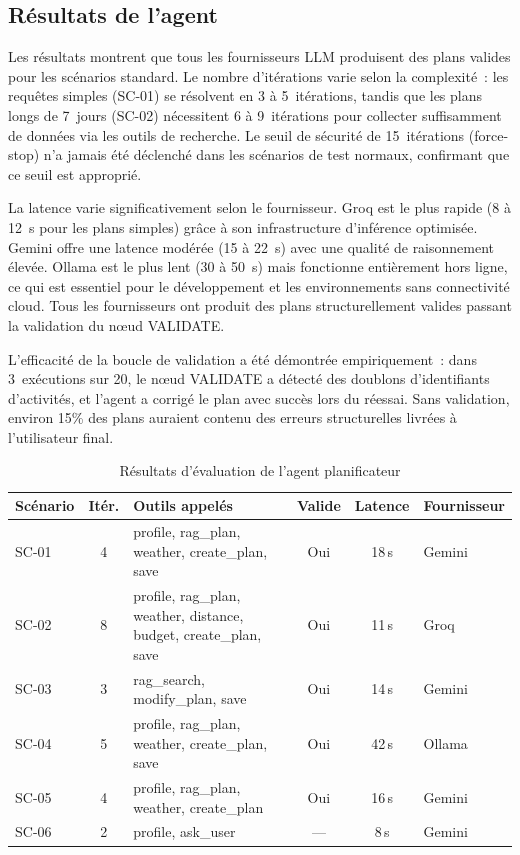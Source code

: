 \subsection{Résultats de l'agent}

Les résultats montrent que tous les fournisseurs LLM produisent des plans valides pour les
scénarios standard. Le nombre d'itérations varie selon la complexité~: les requêtes simples
(SC-01) se résolvent en 3 à 5~itérations, tandis que les plans longs de 7~jours (SC-02)
nécessitent 6 à 9~itérations pour collecter suffisamment de données via les outils de
recherche. Le seuil de sécurité de 15~itérations (force-stop) n'a jamais été déclenché dans
les scénarios de test normaux, confirmant que ce seuil est approprié.

La latence varie significativement selon le fournisseur. Groq est le plus rapide (8 à 12~s
pour les plans simples) grâce à son infrastructure d'inférence optimisée. Gemini offre une
latence modérée (15 à 22~s) avec une qualité de raisonnement élevée. Ollama est le plus
lent (30 à 50~s) mais fonctionne entièrement hors ligne, ce qui est essentiel pour le
développement et les environnements sans connectivité cloud. Tous les fournisseurs ont
produit des plans structurellement valides passant la validation du nœud VALIDATE.

L'efficacité de la boucle de validation a été démontrée empiriquement~: dans 3~exécutions
sur 20, le nœud VALIDATE a détecté des doublons d'identifiants d'activités, et l'agent a
corrigé le plan avec succès lors du réessai. Sans validation, environ 15\% des plans auraient
contenu des erreurs structurelles livrées à l'utilisateur final.

\begin{table}[H]
    \centering
    \caption{Résultats d'évaluation de l'agent planificateur}
    \label{tab:agent_results}
    \footnotesize
    \begin{tabular}{p{1.2cm} c p{4cm} c c p{2.2cm}}
        \toprule
        \textbf{Scénario} & \textbf{Itér.} & \textbf{Outils appelés} &
        \textbf{Valide} & \textbf{Latence} & \textbf{Fournisseur} \\
        \midrule
        SC-01 & 4 & profile, rag\_plan, weather, create\_plan, save &
                Oui & 18\,s & Gemini \\[2pt]
        SC-02 & 8 & profile, rag\_plan, weather, distance, budget, create\_plan, save &
                Oui & 11\,s & Groq \\[2pt]
        SC-03 & 3 & rag\_search, modify\_plan, save &
                Oui & 14\,s & Gemini \\[2pt]
        SC-04 & 5 & profile, rag\_plan, weather, create\_plan, save &
                Oui & 42\,s & Ollama \\[2pt]
        SC-05 & 4 & profile, rag\_plan, weather, create\_plan &
                Oui & 16\,s & Gemini \\[2pt]
        SC-06 & 2 & profile, ask\_user &
                — & 8\,s & Gemini \\
        \bottomrule
    \end{tabular}
\end{table}

